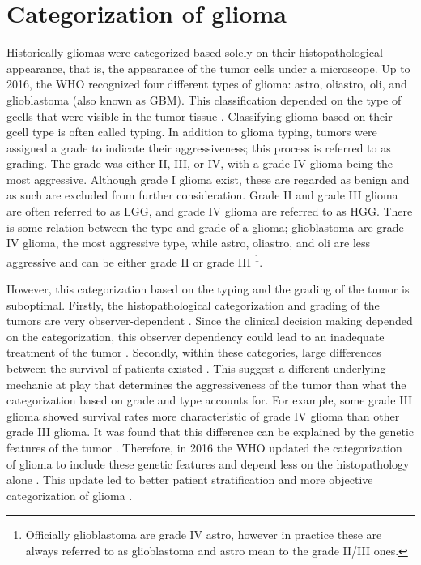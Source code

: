 \section{Categorization of glioma}
Historically \glspl{glioma} were categorized based solely on their histopathological appearance, that is, the appearance of the \gls{tumor} cells under a microscope.
Up to 2016, the \gls{WHO} recognized four different types of \gls{glioma}: \gls{astro}, \gls{oliastro}, \gls{oli}, and \gls{glioblastoma} (also known as \gls{GBM}).
This classification depended on the type of \glspl{gcell} that were visible in the \gls{tumor} tissue \autocite{louis2007who}.
Classifying \gls{glioma} based on their \gls{gcell} type is often called typing.
In addition to \gls{glioma} typing, \glspl{tumor} were assigned a grade to indicate their aggressiveness; this process is referred to as grading.
The grade was either II, III, or IV, with a grade IV \gls{glioma} being the most aggressive.
Although grade I \gls{glioma} exist, these are regarded as benign and as such are excluded from further consideration.
Grade II and grade III \gls{glioma} are often referred to as \gls{LGG}, and grade IV \gls{glioma} are referred to as \gls{HGG}.
There is some relation between the type and grade of a glioma; \gls{glioblastoma} are grade IV glioma, the most aggressive type, while \gls{astro}, \gls{oliastro}, and \gls{oli} are less aggressive and can be either grade II or grade III \footnote{Officially \gls{glioblastoma} are grade IV \gls{astro}, however in practice these are always referred to as \gls{glioblastoma} and \gls{astro} mean to the grade II/III ones.}.

However, this categorization based on the typing and the grading of the \gls{tumor} is suboptimal.
Firstly, the histopathological categorization and grading of the \glspl{tumor} are very observer-dependent \autocite{mittler1996gradingreliability, vandenbent2010interobserver}.
Since the clinical decision making depended on the categorization, this observer dependency could lead to an inadequate treatment of the \gls{tumor} \autocite{vandenbent2010interobserver}.
Secondly, within these categories, large differences between the survival of patients existed  \autocite{dubbink2015molecular}.
This suggest a different underlying mechanic at play that determines the aggressiveness of the \gls{tumor} than what the categorization based on grade and type accounts for.
For example, some grade III \gls{glioma} showed survival rates more characteristic of grade IV \gls{glioma} than other grade III \gls{glioma}.
It was found that this difference can be explained by the genetic features of the \gls{tumor} \autocite{dubbink2015molecular,eckel2015gliomagroups}.
Therefore, in 2016 the \gls{WHO} updated the categorization of \gls{glioma} to include these genetic features and depend less on the histopathology alone \cite{louis20162016}.
This update led to better patient stratification and more objective categorization of \gls{glioma} \autocite{molinaro2019geneticepidemiology}.

